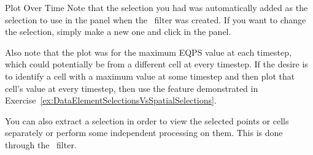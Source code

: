 \begin{exercise}{Plot Over Time}
  Note that the selection you had was automatically added as the selection
  to use in the  panel when the ~\plotSelectionOverTime filter was created.  If you want to change
  the selection, simply make a new one and click  in the  panel.

  Also note that the plot was for the maximum EQPS value at each timestep,
  which could potentially be from a different cell at every timestep. If
  the desire is to identify a cell with a maximum value at some timestep
  and then plot that cell's value at every timestep, then use the
   feature demonstrated in
  Exercise~\ref{ex:DataElementSelectionsVsSpatialSelections}.
\end{exercise}

You can also extract a selection in order to view the selected points or
cells separately or perform some independent processing on them.  This is
done through the ~\extractSelection filter.

